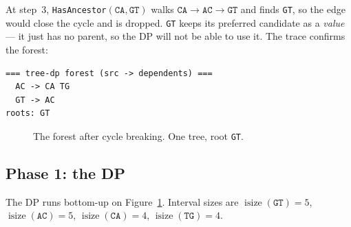 \documentclass[11pt,a4paper]{article}
\theoremstyle{definition}
\theoremstyle{plain}
\theoremstyle{remark}
\newcommand{\isize}{\operatorname{isize}}
\begin{document}
At step~3, \texttt{HasAncestor}$(\mathtt{CA}, \mathtt{GT})$ walks
$\mathtt{CA} \to \mathtt{AC} \to \mathtt{GT}$ and finds \texttt{GT}, so
the edge would close the cycle and is dropped. \texttt{GT} keeps its
preferred candidate as a \emph{value} --- it just has no parent, so the
DP will not be able to use it. The trace confirms the forest:

\begin{verbatim}
=== tree-dp forest (src -> dependents) ===
  AC -> CA TG
  GT -> AC
roots: GT
\end{verbatim}

\begin{figure}[h]
\centering
{}
\caption{The forest after cycle breaking. One tree, root \texttt{GT}.}
\label{fig:forest}
\end{figure}

\subsection{Phase 1: the DP}

The DP runs bottom-up on Figure~\ref{fig:forest}. Interval sizes are
$\isize(\mathtt{GT}) = 5$, $\isize(\mathtt{AC}) = 5$,
$\isize(\mathtt{CA}) = 4$, $\isize(\mathtt{TG}) = 4$.
\end{document}
